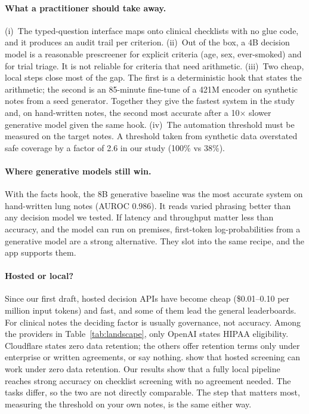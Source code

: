 \documentclass[11pt]{article}
\begin{document}
\paragraph{What a practitioner should take away.}
(i)~The typed-question interface maps onto clinical checklists with no glue code, and it produces an audit trail per criterion.
(ii)~Out of the box, a 4B decision model is a reasonable prescreener for explicit criteria (age, sex, ever-smoked) and for trial triage. It is not reliable for criteria that need arithmetic.
(iii)~Two cheap, local steps close most of the gap. The first is a deterministic hook that states the arithmetic; the second is an 85-minute fine-tune of a 421M encoder on synthetic notes from a seed generator. Together they give the fastest system in the study and, on hand-written notes, the second most accurate after a 10$\times$ slower generative model given the same hook.
(iv)~The automation threshold must be measured on the target notes. A threshold taken from synthetic data overstated safe coverage by a factor of 2.6 in our study (100\% vs 38\%).

\paragraph{Where generative models still win.}
With the facts hook, the 8B generative baseline was the most accurate system on hand-written lung notes (AUROC 0.986).
It reads varied phrasing better than any decision model we tested.
If latency and throughput matter less than accuracy, and the model can run on premises, first-token log-probabilities from a generative model are a strong alternative. They slot into the same recipe, and the app supports them.


\paragraph{Hosted or local?}
Since our first draft, hosted decision APIs have become cheap (\$0.01--0.10 per million input tokens) and fast, and some of them lead the general leaderboards.
For clinical notes the deciding factor is usually governance, not accuracy.
Among the providers in Table~\ref{tab:landscape}, only OpenAI states HIPAA eligibility. Cloudflare states zero data retention; the others offer retention terms only under enterprise or written agreements, or say nothing.
\citet{he2026trial} show that hosted screening can work under zero data retention.
Our results show that a fully local pipeline reaches strong accuracy on checklist screening with no agreement needed. The tasks differ, so the two are not directly comparable. The step that matters most, measuring the threshold on your own notes, is the same either way.
\end{document}
